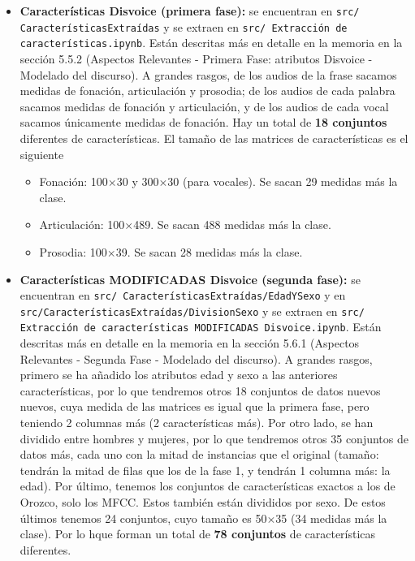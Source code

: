 \begin{itemize}
\item \textbf{Características Disvoice (primera fase):} se encuentran en \texttt{src/ CaracterísticasExtraídas} y se extraen en \texttt{src/ Extracción de características.ipynb}. Están descritas más en detalle en la memoria en la sección 5.5.2 (Aspectos Relevantes - Primera Fase: atributos Disvoice - Modelado del discurso). A grandes rasgos, de los audios de la frase sacamos medidas de fonación, articulación y prosodia; de los audios de cada palabra sacamos medidas de fonación y articulación, y de los audios de cada vocal sacamos únicamente medidas de fonación. Hay un total de \textbf{18 conjuntos} diferentes de características. El tamaño de las matrices de características es el siguiente
	\begin{itemize}
	\item Fonación: 100$\times$30 y 300$\times$30 (para vocales). Se sacan 29 medidas más la clase. 
	\item Articulación: 100$\times$489. Se sacan 488 medidas más la clase.
	\item Prosodia: 100$\times$39. Se sacan 28 medidas más la clase.
	\end{itemize}

\item \textbf{Características MODIFICADAS Disvoice (segunda fase):} se encuentran en \texttt{src/ CaracterísticasExtraídas/EdadYSexo} y en \texttt{src/CaracterísticasExtraídas/DivisionSexo} y se extraen en \texttt{src/ Extracción de características MODIFICADAS Disvoice.ipynb}. Están descritas más en detalle en la memoria en la sección 5.6.1 (Aspectos Relevantes - Segunda Fase - Modelado del discurso). A grandes rasgos, primero se ha añadido los atributos edad y sexo a las anteriores características, por lo que tendremos otros 18 conjuntos de datos nuevos nuevos, cuya medida de las matrices es igual que la primera fase, pero teniendo 2 columnas más (2 características más). Por otro lado, se han dividido entre hombres y mujeres, por lo que tendremos otros 35 conjuntos de datos más, cada uno con la mitad de instancias que el original (tamaño: tendrán la mitad de filas que los de la fase 1, y tendrán 1 columna más: la edad). Por último, tenemos los conjuntos de características exactos a los de Orozco, solo los MFCC. Estos también están divididos por sexo. De estos últimos tenemos 24 conjuntos, cuyo tamaño es 50$\times$35 (34 medidas más la clase). Por lo hque forman un total de \textbf{78 conjuntos} de características diferentes.


\end{itemize}
